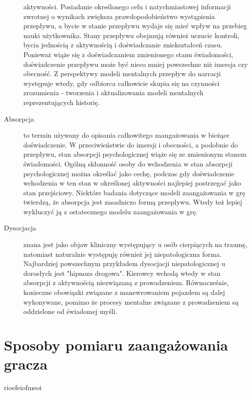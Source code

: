 \begin{description}
            aktywności\cite{development_of_game}. Posiadanie określonego celu i natychmiastowej informacji zwrotnej o wynikach zwiększa
            prawdopodobieństwo wystąpienia przepływu, a bycie w stanie przepływu wydaje się mieć wpływ na przebieg nauki
            użytkownika. Stany przepływu obejmują również uczucie kontroli, bycia jednością z aktywnością i doświadczanie
            zniekształceń czasu. Ponieważ wiąże się z doświadczaniem zmienionego stanu świadomości, doświadczenie
            przepływu może być nieco mniej powszechne niż imersja czy obecność\cite{development_of_game}. Z perspektywy modeli mentalnych
            przepływ do narracji występuje wtedy, gdy odbiorca całkowicie skupia się na czynności zrozumienia -
            tworzenia i aktualizowania modeli mentalnych reprezentujących historię\cite{measuring_narrative}.
      \item[Absorpcja] to termin używany do opisania całkowitego zaangażowania w bieżące doświadczenie. W
            przeciwieństwie do imersji i obecności, a podobnie do przepływu, stan absorpcji psychologicznej
            wiąże się ze zmienionym stanem świadomości\cite{development_of_game}. Ogólną skłonność osoby do wchodzenia
            w stan absorpcji psychologicznej można określać jako cechę, podczas gdy doświadczenie
            wchodzenia w ten stan w określonej aktywności najlepiej postrzegać jako stan przejściowy\cite{development_of_game}.
            Niektóre badania dotyczące modeli zaangażowania w grę twierdzą, że absorpcja jest zasadniczo formą
            przepływu. Wtedy też lepiej wykluczyć ją z ostatecznego modelu zaangażowania w grę\cite{eng_in_games}.
      \item[Dysocjacja] znana jest jako objaw kliniczny występujący u osób cierpiących na traumę, natomiast
            naturalnie występuję również jej niepatologiczna forma\cite{development_of_game}.
            Najbardziej powszechnym przykładem dysocjacji niepatologicznej u dorosłych jest "hipnoza drogowa".
            Kierowcy wchodą wtedy w stan absorpcji z aktywnością niezwiązaną z prowadzeniem.
            Równocześnie, konieczne obowiązki związane z manewrowaniem
            pojazdem są dalej wykonywane, pomimo że procesy mentalne związane z prowadzeniem są oddzielone
            od świadomej myśli\cite{development_of_game}.
\end{description}

\section{Sposoby pomiaru zaangażowania gracza}\label{section:ch3_2}

rioefeiofmeoi
